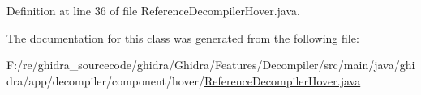 Definition at line 36 of file Reference\+Decompiler\+Hover.\+java.



The documentation for this class was generated from the following file\+:\begin{DoxyCompactItemize}
\item 
F\+:/re/ghidra\+\_\+sourcecode/ghidra/\+Ghidra/\+Features/\+Decompiler/src/main/java/ghidra/app/decompiler/component/hover/\mbox{\hyperlink{_reference_decompiler_hover_8java}{Reference\+Decompiler\+Hover.\+java}}\end{DoxyCompactItemize}
